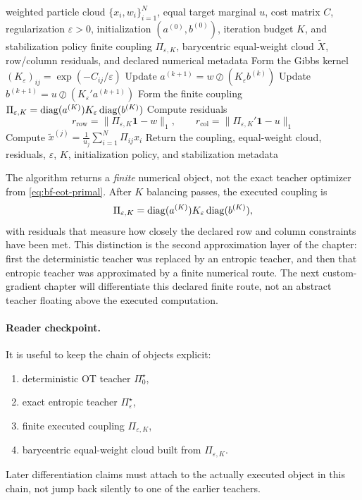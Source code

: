 \begin{algorithm}[ht]
\caption{\texttt{sinkhorn\_equalweight\_step}}
\begin{algorithmic}[1]
\Require weighted particle cloud \(\{x_i,w_i\}_{i=1}^N\), equal target marginal \(u\), cost matrix \(C\), regularization \(\varepsilon>0\), initialization \((a^{(0)},b^{(0)})\), iteration budget \(K\), and stabilization policy
\Ensure finite coupling \(\Pi_{\varepsilon,K}\), barycentric equal-weight cloud \(\widetilde X\), row/column residuals, and declared numerical metadata
\State Form the Gibbs kernel \((K_\varepsilon)_{ij}=\exp(-C_{ij}/\varepsilon)\)
  \State Update \(a^{(k+1)} = w \oslash (K_\varepsilon b^{(k)})\)
  \State Update \(b^{(k+1)} = u \oslash (K_\varepsilon' a^{(k+1)})\)
\EndFor
\State Form the finite coupling \(\Pi_{\varepsilon,K}=\operatorname{diag}(a^{(K)})K_\varepsilon\operatorname{diag}(b^{(K)})\)
\State Compute residuals
\[
  r_{\mathrm{row}}=\|\Pi_{\varepsilon,K}\mathbf 1-w\|_1,
  \qquad
  r_{\mathrm{col}}=\|\Pi_{\varepsilon,K}'\mathbf 1-u\|_1
\]
  \State Compute \(\tilde x^{(j)} = \frac{1}{u_j}\sum_{i=1}^N \Pi_{ij}x_i\)
\EndFor
\State Return the coupling, equal-weight cloud, residuals, \(\varepsilon\), \(K\), initialization policy, and stabilization metadata
\end{algorithmic}
\end{algorithm}

The algorithm returns a \emph{finite} numerical object, not the exact teacher
optimizer from \eqref{eq:bf-eot-primal}.  After \(K\) balancing passes, the
executed coupling is
\begin{equation}
\label{eq:bf-eot-finite-coupling-repeat}
  \Pi_{\varepsilon,K}
  =
  \operatorname{diag}(a^{(K)})K_\varepsilon\operatorname{diag}(b^{(K)}),
\end{equation}
with residuals that measure how closely the declared row and column constraints
have been met.  This distinction is the second approximation layer of the chapter:
first the deterministic teacher was replaced by an entropic teacher, and then that
entropic teacher was approximated by a finite numerical route.  The next custom-
gradient chapter will differentiate this declared finite route, not an abstract
teacher floating above the executed computation.

\paragraph{Reader checkpoint.}
It is useful to keep the chain of objects explicit:
\begin{enumerate}[label=(\roman*)]
  \item deterministic OT teacher \(\Pi_0^\star\),
  \item exact entropic teacher \(\Pi_\varepsilon^\star\),
  \item finite executed coupling \(\Pi_{\varepsilon,K}\),
  \item barycentric equal-weight cloud built from \(\Pi_{\varepsilon,K}\).
\end{enumerate}
Later differentiation claims must attach to the actually executed object in this
chain, not jump back silently to one of the earlier teachers.

